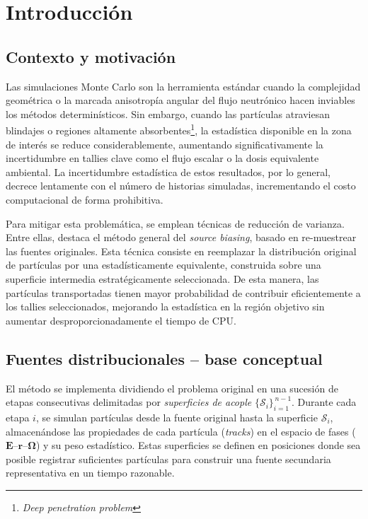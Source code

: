 \chapter{Introducción}

\section{Contexto y motivación}

Las simulaciones Monte Carlo son la herramienta estándar cuando la complejidad geométrica o la marcada anisotropía angular del flujo neutrónico hacen inviables los métodos determinísticos. Sin embargo, cuando las partículas atraviesan blindajes o regiones altamente absorbentes\footnote{\textit{Deep penetration problem}}, la estadística disponible en la zona de interés se reduce considerablemente, aumentando significativamente la incertidumbre en tallies clave como el flujo escalar o la dosis equivalente ambiental. La incertidumbre estadística de estos resultados, por lo general, decrece lentamente con el número de historias simuladas, incrementando el costo computacional de forma prohibitiva.

Para mitigar esta problemática, se emplean técnicas de reducción de varianza. Entre ellas, destaca el método general del \emph{source biasing}, basado en re-muestrear las fuentes originales. Esta técnica consiste en reemplazar la distribución original de partículas por una estadísticamente equivalente, construida sobre una superficie intermedia estratégicamente seleccionada. De esta manera, las partículas transportadas tienen mayor probabilidad de contribuir eficientemente a los tallies seleccionados, mejorando la estadística en la región objetivo sin aumentar desproporcionadamente el tiempo de CPU.

\section{Fuentes distribucionales – base conceptual}

El método se implementa dividiendo el problema original en una sucesión de etapas consecutivas delimitadas por \emph{superficies de acople} $\{\mathcal{S}_{i}\}_{i=1}^{\,n-1}$. Durante cada etapa $i$, se simulan partículas desde la fuente original hasta la superficie $\mathcal{S}_{i}$, almacenándose las propiedades de cada partícula (\emph{tracks}) en el espacio de fases ($\mathbf{E}$–$\mathbf{r}$–$\boldsymbol{\Omega}$) y su peso estadístico. Estas superficies se definen en posiciones donde sea posible registrar suficientes partículas para construir una fuente secundaria representativa en un tiempo razonable.

